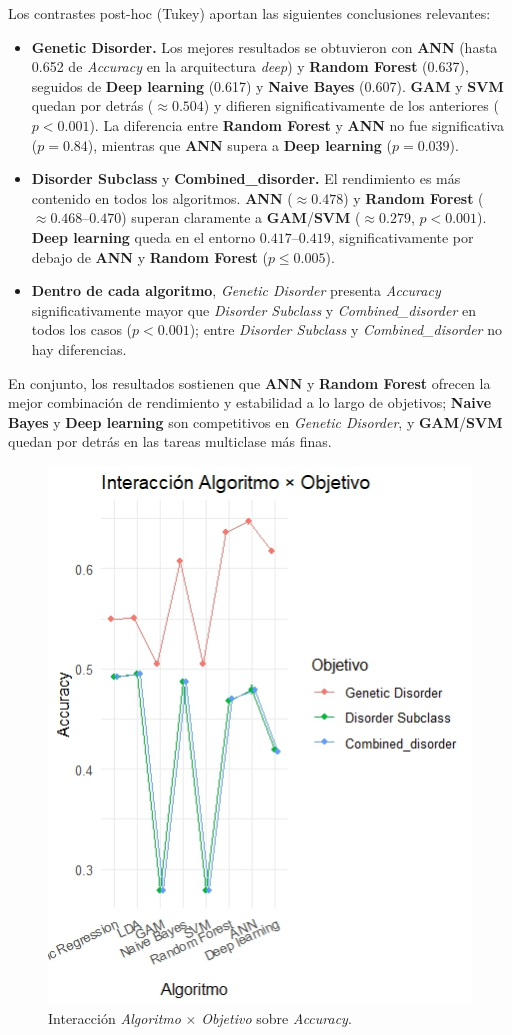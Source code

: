 \documentclass[11pt,a4paper,spanish]{book}
\numberwithin{equation}{chapter}
\numberwithin{figure}{chapter}
\begin{document}
Los contrastes post-hoc (Tukey) aportan las siguientes conclusiones relevantes:
\begin{itemize}
    \item \textbf{Genetic Disorder.} Los mejores resultados se obtuvieron con \textbf{ANN} (hasta 0.652 de \textit{Accuracy} en la arquitectura \textit{deep}) y \textbf{Random Forest} (0.637), seguidos de \textbf{Deep learning} (0.617) y \textbf{Naive Bayes} (0.607). \textbf{GAM} y \textbf{SVM} quedan por detrás ($\approx0.504$) y difieren significativamente de los anteriores ($p<0.001$). La diferencia entre \textbf{Random Forest} y \textbf{ANN} no fue significativa ($p=0.84$), mientras que \textbf{ANN} supera a \textbf{Deep learning} ($p=0.039$).
    \item \textbf{Disorder Subclass} y \textbf{Combined\_disorder.} El rendimiento es más contenido en todos los algoritmos. \textbf{ANN} ($\approx0.478$) y \textbf{Random Forest} ($\approx0.468$--$0.470$) superan claramente a \textbf{GAM}/\textbf{SVM} ($\approx0.279$, $p<0.001$). \textbf{Deep learning} queda en el entorno $0.417$--$0.419$, significativamente por debajo de \textbf{ANN} y \textbf{Random Forest} ($p\le0.005$).
    \item \textbf{Dentro de cada algoritmo}, \textit{Genetic Disorder} presenta \textit{Accuracy} significativamente mayor que \textit{Disorder Subclass} y \textit{Combined\_disorder} en todos los casos ($p<0.001$); entre \textit{Disorder Subclass} y \textit{Combined\_disorder} no hay diferencias.
\end{itemize}

En conjunto, los resultados sostienen que \textbf{ANN} y \textbf{Random Forest} ofrecen la mejor combinación de rendimiento y estabilidad a lo largo de objetivos; \textbf{Naive Bayes} y \textbf{Deep learning} son competitivos en \textit{Genetic Disorder}, y \textbf{GAM}/\textbf{SVM} quedan por detrás en las tareas multiclase más finas.

\begin{figure}[htbp]
    \centering
    \includegraphics[width=0.5\linewidth]{Rplot01.jpeg}
    \caption{Interacción \textit{Algoritmo} $\times$ \textit{Objetivo} sobre \textit{Accuracy}.}
    \label{fig:interaccion_modelo_objetivo}
\end{figure}
\end{document}
